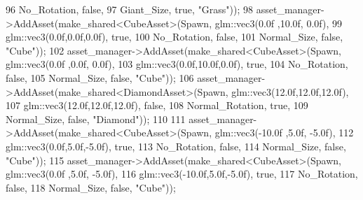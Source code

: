 \begin{DoxyCode}
96                                                         No\_Rotation, \textcolor{keyword}{false},
97                                                         Giant\_Size, \textcolor{keyword}{true}, \textcolor{stringliteral}{"Grass"}));
98         asset\_manager->AddAsset(make\_shared<CubeAsset>(Spawn, glm::vec3(0.0f ,10.0f, 0.0f),
99                                                          glm::vec3(0.0f,0.0f,0.0f), \textcolor{keyword}{true},
100                                                          No\_Rotation, \textcolor{keyword}{false},
101                                                          Normal\_Size, \textcolor{keyword}{false}, \textcolor{stringliteral}{"Cube"}));
102         asset\_manager->AddAsset(make\_shared<CubeAsset>(Spawn, glm::vec3(0.0f ,0.0f, 0.0f),
103                                                        glm::vec3(0.0f,10.0f,0.0f), \textcolor{keyword}{true},
104                                                          No\_Rotation, \textcolor{keyword}{false}, 
105                                                          Normal\_Size, \textcolor{keyword}{false}, \textcolor{stringliteral}{"Cube"}));
106         asset\_manager->AddAsset(make\_shared<DiamondAsset>(Spawn, glm::vec3(12.0f,12.0f,12.0f), 
107                                                           glm::vec3(12.0f,12.0f,12.0f), \textcolor{keyword}{false},
108                                                           Normal\_Rotation, \textcolor{keyword}{true},
109                                                           Normal\_Size, \textcolor{keyword}{false}, \textcolor{stringliteral}{"Diamond"})); 
110                                                           
111         asset\_manager->AddAsset(make\_shared<CubeAsset>(Spawn, glm::vec3(-10.0f ,5.0f, -5.0f),
112                                                          glm::vec3(0.0f,5.0f,-5.0f), \textcolor{keyword}{true},
113                                                          No\_Rotation, \textcolor{keyword}{false},
114                                                          Normal\_Size, \textcolor{keyword}{false}, \textcolor{stringliteral}{"Cube"}));
115         asset\_manager->AddAsset(make\_shared<CubeAsset>(Spawn, glm::vec3(0.0f ,5.0f, -5.0f),
116                                                        glm::vec3(-10.0f,5.0f,-5.0f), \textcolor{keyword}{true},
117                                                          No\_Rotation, \textcolor{keyword}{false}, 
118                                                          Normal\_Size, \textcolor{keyword}{false}, \textcolor{stringliteral}{"Cube"})); 

\end{DoxyCode}
